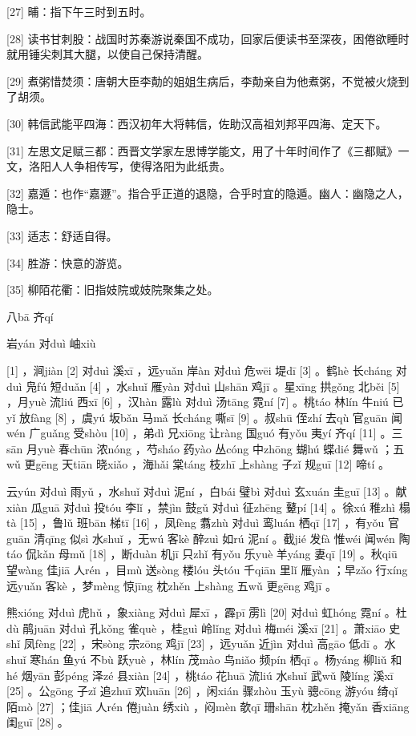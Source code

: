 \documentclass[12pt,UTF8]{ctexbook}
\begin{document}
[27] 晡：指下午三时到五时。

[28] 读书甘刺股：战国时苏秦游说秦国不成功，回家后便读书至深夜，困倦欲睡时就用锤尖刺其大腿，以使自己保持清醒。

[29] 煮粥惜焚须：唐朝大臣李勣的姐姐生病后，李勣亲自为他煮粥，不觉被火烧到了胡须。

[30] 韩信武能平四海：西汉初年大将韩信，佐助汉高祖刘邦平四海、定天下。

[31] 左思文足赋三都：西晋文学家左思博学能文，用了十年时间作了《三都赋》一文，洛阳人人争相传写，使得洛阳为此纸贵。

[32] 嘉遁：也作“嘉遯”。指合乎正道的退隐，合乎时宜的隐遁。幽人：幽隐之人，隐士。

[33] 适志：舒适自得。

[34] 胜游：快意的游览。

[35] 柳陌花衢：旧指妓院或妓院聚集之处。





八bā 齐qí


岩yán 对duì 岫xiù





[1] ，涧jiàn [2] 对duì 溪xī ，远yuǎn 岸àn 对duì 危wēi 堤dī [3] 。鹤hè 长cháng 对duì 凫fú 短duǎn [4] ，水shuǐ 雁yàn 对duì 山shān 鸡jī 。星xīng 拱gǒng 北běi [5] ，月yuè 流liú 西xī [6] ，汉hàn 露lù 对duì 汤tāng 霓ní [7] 。桃táo 林lín 牛niú 已yǐ 放fàng [8] ，虞yú 坂bǎn 马mǎ 长cháng 嘶sī [9] 。叔shū 侄zhí 去qù 官guān 闻wén 广guǎng 受shòu [10] ，弟dì 兄xiōng 让ràng 国guó 有yǒu 夷yí 齐qí [11] 。三sān 月yuè 春chūn 浓nóng ，芍sháo 药yào 丛cóng 中zhōng 蝴hú 蝶dié 舞wǔ ；五wǔ 更gēng 天tiān 晓xiǎo ，海hǎi 棠táng 枝zhī 上shàng 子zǐ 规guī [12] 啼tí 。

云yún 对duì 雨yǔ ，水shuǐ 对duì 泥ní ，白bái 璧bì 对duì 玄xuán 圭guī [13] 。献xiàn 瓜guā 对duì 投tóu 李lǐ ，禁jìn 鼓gǔ 对duì 征zhēng 鼙pí [14] 。徐xú 稚zhì 榻tà [15] ，鲁lǔ 班bān 梯tī [16] ，凤fèng 翥zhù 对duì 鸾luán 栖qī [17] ，有yǒu 官guān 清qīng 似sì 水shuǐ ，无wú 客kè 醉zuì 如rú 泥ní 。截jié 发fà 惟wéi 闻wén 陶táo 侃kǎn 母mǔ [18] ，断duàn 机jī 只zhǐ 有yǒu 乐yuè 羊yáng 妻qī [19] 。秋qiū 望wàng 佳jiā 人rén ，目mù 送sòng 楼lóu 头tóu 千qiān 里lǐ 雁yàn ；早zǎo 行xíng 远yuǎn 客kè ，梦mèng 惊jīng 枕zhěn 上shàng 五wǔ 更gēng 鸡jī 。

熊xióng 对duì 虎hǔ ，象xiàng 对duì 犀xī ，霹pī 雳lì [20] 对duì 虹hóng 霓ní 。杜dù 鹃juān 对duì 孔kǒng 雀què ，桂guì 岭lǐng 对duì 梅méi 溪xī [21] 。萧xiāo 史shǐ 凤fèng [22] ，宋sòng 宗zōng 鸡jī [23] ，远yuǎn 近jìn 对duì 高gāo 低dī 。水shuǐ 寒hán 鱼yú 不bù 跃yuè ，林lín 茂mào 鸟niǎo 频pín 栖qī 。杨yáng 柳liǔ 和hé 烟yān 彭péng 泽zé 县xiàn [24] ，桃táo 花huā 流liú 水shuǐ 武wǔ 陵líng 溪xī [25] 。公gōng 子zǐ 追zhuī 欢huān [26] ，闲xián 骤zhòu 玉yù 骢cōng 游yóu 绮qǐ 陌mò [27] ；佳jiā 人rén 倦juàn 绣xiù ，闷mèn 欹qī 珊shān 枕zhěn 掩yǎn 香xiāng 闺guī [28] 。
\end{document}
